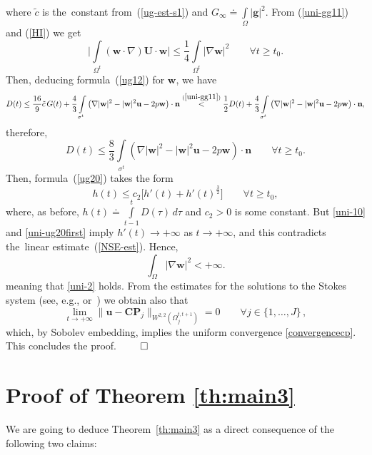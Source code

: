 \documentclass[11pt]{article}
\numberwithin{equation}{section}
\numberwithin{figure}{section}
\def\ue{{\mathbf u}}
\def\cc{{\tilde c}}
\def\n{{\mathbf n}}
\def\we{{\mathbf w}}
\begin{document}
where $\cc$ is the~constant from~(\ref{ug-est-s1}) and $G_\infty\doteq\int\limits_\Omega|\mathbf{g}|^2$.
From (\ref{uni-gg11}) and (\ref{HI}) we get
\begin{equation}\label{uni-gg13}\biggl|\int\limits_{\Omega^t}(\mathbf{w} \cdot \nabla) \mathbf{U}\cdot\we\biggr|\le
	\frac14\int\limits_{\Omega^{t}}|\nabla\we|^2\qquad \forall t\ge t_0.
\end{equation}
Then, deducing formula~(\ref{ug12}) for $\we$, we have
\begin{equation}\label{uni-ug12}D(t)\le\frac{16}9 \cc\,G(t)+\frac43\int\limits_{\sigma^t} \left(\nabla |\we|^2- |\we|^2\ue-2p\we \right)
\cdot\n\overset{(\ref{uni-gg11})}<
	\frac12 D(t)+\frac43\int\limits_{\sigma^t}\left(\nabla |\we|^2- |\we|^2\ue-2p\we \right)\cdot\n,\end{equation}
therefore,
\begin{equation}\label{uni-ug13}D(t)\le\frac83\int\limits_{\sigma^t}\left(\nabla |\we|^2- |\we|^2\ue-2p\we \right)\cdot\n\qquad \forall t\ge t_0.\end{equation}
Then, formula~(\ref{ug20}) takes the form
\begin{equation}\label{uni-ug20first}
h(t)\le c_2\biggl[h'(t)+h'(t)^\frac32\biggr]\qquad \forall t\ge t_0,
\end{equation}
where, as before, $h(t)\doteq
\int\limits_{t-1}^t D(\tau)\,d\tau$ and $c_2>0$ is some constant.
But \eqref{uni-10} and \eqref{uni-ug20first} imply $h'(t)\to+\infty$ as $t\to+\infty$, and this contradicts the~linear estimate~(\ref{NSE-est}). Hence,
$$
\int_{\Omega}|\nabla\we|^2 < +\infty.
$$
meaning that \eqref{uni-2} holds. From the estimates for the solutions to the Stokes system (see, e.g., \cite[Section~IV.6]{galdi2011introduction} or
\cite[Section~2.4.2]{korobkov2024steady}\,) we obtain also that
$$
\lim\limits_{t \to +\infty} \| \ue-\textbf{CP}_{j} \|_{W^{2,2}(\Omega^{t,t+1}_{j})} = 0 \qquad \forall j \in \{1,\dots,J \} \, ,
$$
which, by Sobolev embedding, implies the uniform convergence \eqref{convergencecp}. This concludes the proof.
\hfill$\qed$

\section{Proof of Theorem \ref{th:main3}}
\label{poet8.2}

We are going to deduce Theorem~\ref{th:main3} as a direct consequence of the following two claims:
\end{document}
